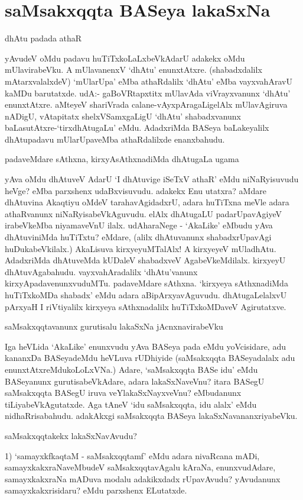 \chapter{saMsakxqqta BASeya lakaSxNa}

dhAtu padada athaR

yAvudeV oMdu padavu huTiTxkoLaLxbeVkAdarU adakekx oMdu mUlavirabeVku. A mUlavanenxV `dhAtu' enunxtAtxre. (shabadxdalilx mAtarxvalalxdeV) `mUlarUpa' eMba athaRdalilx `dhAtu' eMba vayxvahAravU kaMDu barutatxde. udA:- gaBoVRtapxtitx mUlavAda viVrayxvanunx `dhAtu' enunxtAtxre. aMteyeV shariVrada calane-vAyxpAragaLigelAlx mUlavAgiruva nADigU, vAtapitatx shelxVSamxgaLigU `dhAtu' shabadxvanunx baLasutAtxre-`tirxdhAtugaLu' eMdu. AdadxriMda BASeya baLakeyalilx dhAtupadavu mUlarUpaveMba athaRdalilxde enanxbahudu.

padaveMdare sAthxna, kirxyAsAthxnadiMda dhAtugaLa ugama

yAva oMdu dhAtuveV AdarU `I dhAtuvige iSeTxV athaR' eMdu niNaRyisuvudu heVge? eMba parxshenx udaBxvisuvudu. adakekx Enu utatxra? aMdare dhAtuvina Akaqtiyu oMdeV tarahavAgidadxrU, adara huTiTxna meVle adara athaRvanunx niNaRyisabeVkAguvudu. elAlx dhAtugaLU padarUpavAgiyeV irabeVkeMba niyamaveVnU ilalx. udAharaNege - `AkaLike' eMbudu yAva dhAtuviniMda huTiTxtu? eMdare, (alilx dhAtuvanunx shabadxrUpavAgi huDukabeVkilalx.) AkaLisuva kirxyeyuMTalAlx! A kirxyeyeV mUladhAtu. AdadxriMda dhAtuveMda kUDaleV shabadxveV AgabeVkeMdilalx. kirxyeyU dhAtuvAgabahudu. vayxvahAradalilx `dhAtu'vanunx kirxyApadavenunxvuduMTu. padaveMdare sAthxna. `kirxyeya sAthxnadiMda huTiTxkoMDa shabadx' eMdu adara aBipArxyavAguvudu. dhAtugaLelalxvU pArxyaH I riVtiyalilx kirxyeya sAthxnadalilx huTiTxkoMDaveV Agirutatxve.

saMsakxqqtavanunx gurutisalu lakaSxNa jAcnxnavirabeVku

Iga heVLida `AkaLike' enunxvudu yAva BASeya pada eMdu yoVcisidare, adu kananxDa BASeyadeMdu heVLuva rUDhiyide (saMsakxqqta BASeyadalalx adu enunxtAtxreMdukoLoLxVNa.) Adare, `saMsakxqqta BASe idu' eMdu BASeyanunx gurutisabeVkAdare, adara lakaSxNaveVnu? itara BASegU saMsakxqqta BASegU iruva veYlakaSxNayxveVnu? eMbudanunx tiLiyabeVkAgutatxde. Aga tAneV `idu saMsakxqqta, idu alalx' eMdu nidhaRrisabahudu. adakAkxgi saMsakxqqta BASeya lakaSxNavananxriyabeVku.

saMsakxqqtakekx lakaSxNavAvudu?

1) `samayxkfkaqtaM - saMsakxqqtamf' eMdu adara nivaRcana mADi, samayxkakxraNaveMbudeV saMsakxqqtavAgalu kAraNa, enunxvudAdare, samayxkakxraNa mADuva modalu adakikxdadx rUpavAvudu? yAvudanunx samayxkakxrisidaru? eMdu parxshenx ELutatxde.

